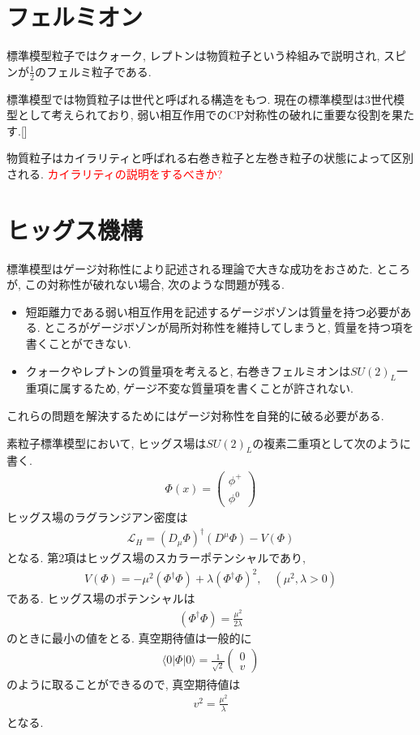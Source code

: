 \documentclass[uplatex,dvipdfmx,a4paper,titlepage]{jsbook}
\theoremstyle{plain}
\theoremstyle{definition}
\begin{document}
\section{フェルミオン}
標準模型粒子ではクォーク, レプトンは物質粒子という枠組みで説明され, スピンが$\frac{1}{2}$のフェルミ粒子である.

標準模型では物質粒子は世代と呼ばれる構造をもつ.
現在の標準模型は3世代模型として考えられており, 弱い相互作用でのCP対称性の破れに重要な役割を果たす.[]

物質粒子はカイラリティと呼ばれる右巻き粒子と左巻き粒子の状態によって区別される.
\textcolor{red}{カイラリティの説明をするべきか?}
\section{ヒッグス機構}
標準模型はゲージ対称性により記述される理論で大きな成功をおさめた.
ところが, この対称性が破れない場合, 次のような問題が残る.
\begin{itemize}
  \item 短距離力である弱い相互作用を記述するゲージボゾンは質量を持つ必要がある. ところがゲージボゾンが局所対称性を維持してしまうと, 質量を持つ項を書くことができない.
  \item クォークやレプトンの質量項を考えると, 右巻きフェルミオンは$SU(2)_L$一重項に属するため, ゲージ不変な質量項を書くことが許されない.
\end{itemize}
これらの問題を解決するためにはゲージ対称性を自発的に破る必要がある.

素粒子標準模型において, ヒッグス場は$SU(2)_L$の複素二重項として次のように書く.
\begin{align}
  \Phi(x) = \left(
  \begin{array}{c}
    \phi^+ \\
    \phi^0
  \end{array}
  \right)
\end{align}
ヒッグス場のラグランジアン密度は
\begin{align}
  \mathcal{L}_H = \left(D_\mu \Phi\right)^\dagger (D^\mu \Phi) -V(\Phi) \label{L_H}
\end{align}
となる.
第2項はヒッグス場のスカラーポテンシャルであり,
\begin{align}
  V(\Phi) = -\mu^2 (\Phi^\dagger\Phi)+ {\lambda}(\Phi^\dagger \Phi)^2,\quad(\mu^2, \lambda>0)\label{V_H}
\end{align}
である.
ヒッグス場のポテンシャルは
\begin{align}
  (\Phi^\dagger \Phi) = \frac{\mu^2}{2\lambda}\nonumber
\end{align}
のときに最小の値をとる.
真空期待値は一般的に
\begin{align}
  \langle 0 |\Phi |0\rangle = \frac{1}{\sqrt{2}}\left(\begin{array}{c}
      0 \\
      v
      \end{array}\right)
\end{align}
のように取ることができるので, 真空期待値は
\begin{align}
  v^2 = \frac{\mu^2}{\lambda}\nonumber
\end{align}
となる.
\end{document}
